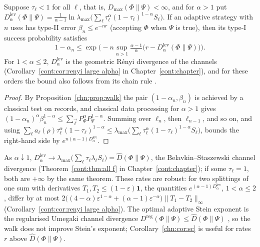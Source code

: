 \begin{corollary}\label{chn:cor:sc}
Suppose $\tau_\ell<1$ for all $\ell$, that is, $D_{\max}(\Phi\|\Psi)<\infty$, and for $\alpha>1$ put $D^{\mathrm{lev}}_\alpha(\Phi\|\Psi)=\frac1{\alpha-1}\ln\lambda_{\max}\big(\sum_\ell\tau_\ell^\alpha(1-\tau_\ell)^{1-\alpha}S_\ell\big)$. If an adaptive strategy with $n$ uses has type-II error $\beta_n\le e^{-nr}$ (accepting $\Phi$ when $\Psi$ is true), then its type-I success probability satisfies
\[
1-\alpha_n\le\exp\Big(-n\sup_{\alpha>1}\tfrac{\alpha-1}{\alpha}\big(r-D^{\mathrm{lev}}_\alpha(\Phi\|\Psi)\big)\Big).
\]
For $1<\alpha\le2$, $D^{\mathrm{lev}}_\alpha$ is the geometric R\'enyi divergence of the channels \cite{FangFawzi2021} (Corollary~\ref{cont:cor:renyi large alpha} in Chapter~\ref{cont:chapter}), and for these orders the bound also follows from its chain rule \cite{FangFawzi2021}.
\end{corollary}

\begin{proof}
By Proposition~\ref{chn:prop:walk} the pair $(1-\alpha_n,\beta_n)$ is achieved by a classical test on records, and classical data processing for $\alpha>1$ gives $(1-\alpha_n)^\alpha\beta_n^{1-\alpha}\le\sum_{\vec\ell}P_\Phi^\alpha P_\Psi^{1-\alpha}$. Summing over $\ell_n$, then $\ell_{n-1}$, and so on, and using $\sum_\ell a_\ell(\rho)\tau_\ell^\alpha(1-\tau_\ell)^{1-\alpha}\le\lambda_{\max}\big(\sum_\ell\tau_\ell^\alpha(1-\tau_\ell)^{1-\alpha}S_\ell\big)$, bounds the right-hand side by $e^{n(\alpha-1)D^{\mathrm{lev}}_\alpha}$.
\end{proof}

\begin{remark}
As $\alpha\downarrow1$, $D^{\mathrm{lev}}_\alpha\to\lambda_{\max}\big(\sum_\ell\tau_\ell\lambda_\ell S_\ell\big)=\widehat D(\Phi\|\Psi)$, the Belavkin--Staszewski channel divergence (Theorem~\ref{cont:thm:all f} in Chapter~\ref{cont:chapter}); if some $\tau_\ell=1$, both are $+\infty$ by the same theorem. These rates are robust: for two splittings of one sum with derivatives $T_1,T_2\le(1-\varepsilon)\mathbf 1$, the quantities $e^{(\alpha-1)D^{\mathrm{lev}}_\alpha}$, $1<\alpha\le2$, differ by at most $2\big((4-\alpha)\varepsilon^{1-\alpha}+(\alpha-1)\varepsilon^{-\alpha}\big)\|T_1-T_2\|_\infty$ (Corollary~\ref{cont:cor:renyi large alpha}). The optimal adaptive Stein exponent is the regularised Umegaki channel divergence $D^{\mathrm{reg}}(\Phi\|\Psi)\le\widehat D(\Phi\|\Psi)$ \cite{FFRS2020}, so the walk does not improve Stein's exponent; Corollary~\ref{chn:cor:sc} is useful for rates $r$ above $\widehat D(\Phi\|\Psi)$.
\end{remark}

